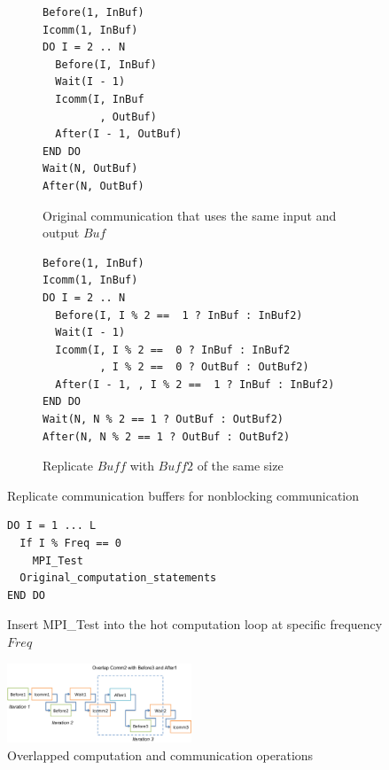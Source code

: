 \begin{figure}
{\scriptsize
  \centering
  \begin{subfigure}[b]{.20\textwidth}
\begin{verbatim}
Before(1, InBuf)
Icomm(1, InBuf)
DO I = 2 .. N
  Before(I, InBuf)
  Wait(I - 1)
  Icomm(I, InBuf
         , OutBuf)
  After(I - 1, OutBuf)
END DO
Wait(N, OutBuf)
After(N, OutBuf)
\end{verbatim}
    \caption{Original communication that uses the same input and output $Buf$}
    \label{fig:cco:dup:a}
  \end{subfigure}
  \hspace{.01in}
  \begin{subfigure}[b]{.28\textwidth}
\begin{verbatim}
Before(1, InBuf)
Icomm(1, InBuf)
DO I = 2 .. N
  Before(I, I % 2 ==  1 ? InBuf : InBuf2)
  Wait(I - 1)
  Icomm(I, I % 2 ==  0 ? InBuf : InBuf2
         , I % 2 ==  0 ? OutBuf : OutBuf2)
  After(I - 1, , I % 2 ==  1 ? InBuf : InBuf2)
END DO
Wait(N, N % 2 == 1 ? OutBuf : OutBuf2)
After(N, N % 2 == 1 ? OutBuf : OutBuf2)
\end{verbatim}
    \caption{Replicate $Buff$ with $Buff2$ of the same size}
    \label{fig:cco:dup:b}
  \end{subfigure}
\caption{Replicate communication buffers for nonblocking communication}
\label{fig:cco:dup}
}
\end{figure}

\begin{figure}[h]
{\scriptsize
\begin{verbatim}
DO I = 1 ... L
  If I % Freq == 0
    MPI_Test
  Original_computation_statements
END DO
\end{verbatim}
}
\caption{Insert MPI\_Test into the hot computation loop at specific frequency $Freq$}
\label{fig:cco:test}
\end{figure}

\begin{figure}[h]
\centering
\includegraphics[width=0.49\textwidth]{fig/ft_shift.png}
\caption{Overlapped computation and communication operations}
\label{fig:cco:shift}
\end{figure}
